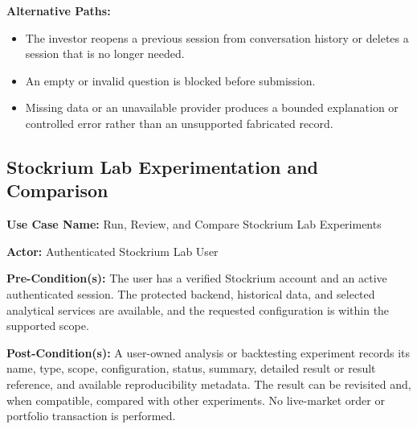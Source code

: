 \noindent\textbf{Alternative Paths:}
\begin{itemize}[leftmargin=*, nosep]
    \item The investor reopens a previous session from conversation history or deletes a session that is no longer needed.
    \item An empty or invalid question is blocked before submission.
    \item Missing data or an unavailable provider produces a bounded explanation or controlled error rather than an unsupported fabricated record.
\end{itemize}

\subsection{Stockrium Lab Experimentation and Comparison}
\label{subsec:experimentation-backtesting}

\noindent\textbf{Use Case Name:} Run, Review, and Compare Stockrium Lab Experiments

\noindent\textbf{Actor:} Authenticated Stockrium Lab User

\noindent\textbf{Pre-Condition(s):} The user has a verified Stockrium account and an active authenticated session. The protected backend, historical data, and selected analytical services are available, and the requested configuration is within the supported scope.

\noindent\textbf{Post-Condition(s):} A user-owned analysis or backtesting experiment records its name, type, scope, configuration, status, summary, detailed result or result reference, and available reproducibility metadata. The result can be revisited and, when compatible, compared with other experiments. No live-market order or portfolio transaction is performed.

